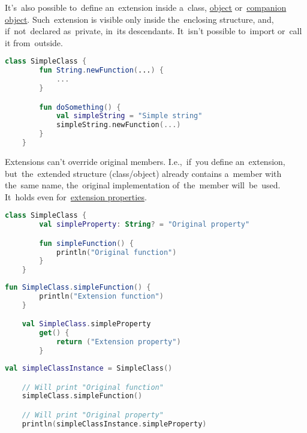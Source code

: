 \noindent It's~also possible to~define an~extension inside a~class, \hyperref[kotlinobject]{object} or~\hyperref[kotlincompanionobject]{companion object}.
Such~extension is visible only inside the~enclosing structure, and, if~not~declared as~private, in~its descendants.
It~isn't possible to~import or~call it from~outside.
\newpage

\begin{lstlisting}[language=Kotlin, title={Extension definition}]
    class SimpleClass {
        fun String.newFunction(...) {
            ...
        }

        fun doSomething() {
            val simpleString = "Simple string"
            simpleString.newFunction(...)
        }
    }
\end{lstlisting}

Extensions can't override original members.
I.e.,~if~you define an~extension, but~the~extended structure (class/object) already contains a~member with the~same name, the~original implementation of~the~member will~be~used.
It~holds even for~\hyperref[kotlinextensionproperty]{extension properties}.

\example
\begin{lstlisting}[language=Kotlin, title={Class with some members}]
    class SimpleClass {
        val simpleProperty: String? = "Original property"

        fun simpleFunction() {
            println("Original function")
        }
    }
\end{lstlisting}
\begin{lstlisting}[language=Kotlin, title={Extensions with same names}]
    fun SimpleClass.simpleFunction() {
        println("Extension function")
    }

    val SimpleClass.simpleProperty
        get() {
            return ("Extension property")
        }
\end{lstlisting}
\newpage

\begin{lstlisting}[language=Kotlin, title={Behavior}]
    val simpleClassInstance = SimpleClass()

    // Will print "Original function"
    simpleClass.simpleFunction()

    // Will print "Original property"
    println(simpleClassInstance.simpleProperty)
\end{lstlisting}
